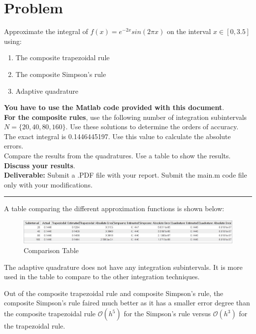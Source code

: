 \documentclass[12pt,letterpaper]{article}
\begin{document}
\newcommand{\norm}[1]{\left\lVert#1\right\rVert}

\section*{Problem}

Approximate the integral of $f(x)=e^{-2x}sin(2\pi x)$ on the interval $x \in [0,3.5]$ using:
\begin{enumerate}
	\item The composite trapezoidal rule
	\item The composite Simpson's rule
	\item Adaptive quadrature
\end{enumerate}
\textbf{You have to use the Matlab code provided with this document}.\\

\textbf{For the composite rules}, use the following number of integration subintervals $N=\{20,40,80,160\}$. Use these solutions to determine the orders of accuracy. The exact integral is 0.1446445197. Use this value to calculate the absolute errors.\\

Compare the results from the quadratures. Use a table to show the results.\\

\textbf{Discuss your results}.\\


\textbf{Deliverable:} Submit a .PDF file with your report. Submit the main.m code file only with your modifications.

\noindent\rule{1\linewidth}{0.2pt}

A table comparing the different approximation functions is shown below:
\begin{figure}[h!]
    \centering
    \includegraphics[width=1.1\linewidth]{table.jpg}
    \caption{Comparison Table}\label{fig:Comparison_Table}
\end{figure}

The adaptive quadrature does not have any integration subintervals. It is more used in the table to compare to the other integration techniques.

Out of the composite trapezoidal rule and composite Simpson's rule, the composite Simpson's rule faired much better as it has a smaller error degree than the composite trapezoidal rule $\mathcal{O}(h^{5})$ for the Simpson's rule versus $\mathcal{O}(h^{3})$ for the trapezoidal rule.
\end{document}
